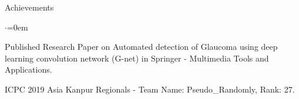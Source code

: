 \documentclass{resume} %
\begin{document}

    \begin{rSection}{Achievements}
        \begin{list}{$\cdot$}{\leftmargin=0em}
        
            \itemsep -6pt
                \item Published Research Paper on Automated detection of Glaucoma using deep learning convolution network (G-net) in Springer - Multimedia Tools and Applications.
                \item ICPC 2019 Asia Kanpur Regionals - Team Name: Pseudo\_Randomly, Rank: 27.

        \end{list}

    \end{rSection}
\end{document}
